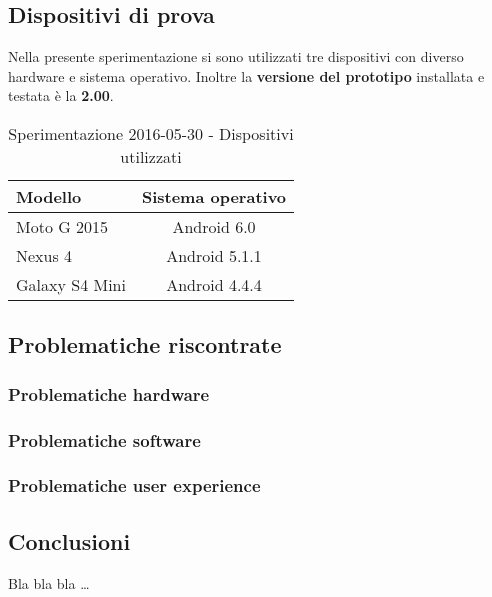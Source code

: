 \documentclass[../Sperimentazione.tex]{subfiles}
\begin{document}
		\subsection{Dispositivi di prova}
			Nella presente sperimentazione si sono utilizzati tre dispositivi con diverso hardware e sistema operativo. Inoltre la \textbf{versione del prototipo} installata e testata è la \textbf{2.00}.
	
			\begin{table} [h]
			\centering
				\begin{tabular}{lc}
					\textbf{Modello} & \textbf{Sistema operativo} \\
					\toprule
					 Moto G 2015 & Android 6.0 \\
					 \midrule
					 Nexus 4 & Android 5.1.1 \\
					 \midrule
					 Galaxy S4 Mini & Android 4.4.4 \\
					\bottomrule
				\end{tabular}
				\caption{Sperimentazione 2016-05-30 - Dispositivi utilizzati}
				\label{tab:Sperimentazione1Dispositivi}
			\end{table}
		
			
		\newpage
			
	
		\newpage
		\subsection{Problematiche riscontrate}
		
			\subsubsection{Problematiche hardware}
		
			\subsubsection{Problematiche software}
		
			\subsubsection{Problematiche user experience}
			
		\newpage
		\subsection{Conclusioni}
			Bla bla bla \dots
\end{document}
